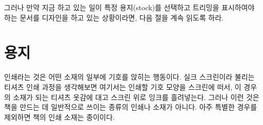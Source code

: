 그러나 만약 지금 하고 있는 일이 특정 용지(stock)를 선택하고 트리밍을
표시하여야 하는 문서를 디자인을 하고 있는 상황이라면, 다음 절을 계속 읽도록 하라.







\section{용지}
\label{sec:stock-material}

인쇄라는 것은 어떤 소재의 일부에 기호를 앉히는 행동이다.
실크 스크린이라 불리는 티셔츠 인쇄 과정을 생각해보면 여기서는
인쇄할 기호 모양을 스크린에 떠서, 이 경우의 소재가 되는 티셔츠 옷감에 대고 
스크린 위로 잉크를 흘려넣는다. 그러나 이런 것은
책을 만드는 데 일반적으로 쓰이는 종류의 인쇄나 소재가 아니다.
아주 특별한 경우를 제외하면 책의 인쇄 소재는 종이이다.

